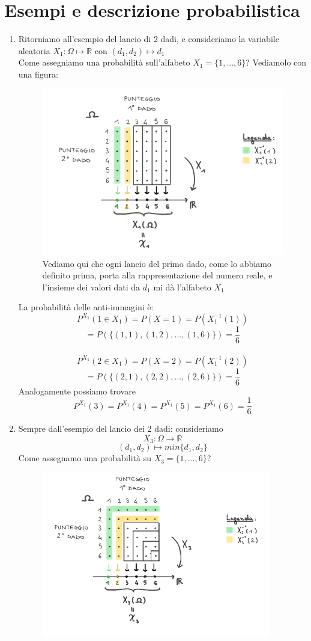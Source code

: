 \documentclass{report}
\begin{document}
\section{Esempi e descrizione probabilistica}
\begin{enumerate}
    \item Ritorniamo all'esempio del lancio di 2 dadi, e consideriamo la variabile aleatoria \(X_1: \Omega \longmapsto \mathbb{R} \text{ con } (d_1, d_2) \mapsto d_1\)\\
    Come assegniamo una probabilità sull'alfabeto \(\textit{X}_1 = \{1, ..., 6\}\)? Vediamolo con una figura:
    \begin{figure}[hb]
        \centering
        \includegraphics[width = 11cm]{VariabileAleatoriaLancio2dadi.PNG}
        \caption{Vediamo qui che ogni lancio del primo dado, come lo abbiamo definito prima, porta alla rappresentazione del numero reale, e l'insieme dei valori dati da \(d_1\) mi dà l'alfabeto \(\textit{X}_1\) }
        \label{fig:VariabileAleatoriaLancioDadi}
    \end{figure}
    La probabilità delle anti-immagini è:
    \[P^{X_1}(1 \in X_1) = P(X = 1) = P(X_1^{-1}(1))\] \[= P(\{(1,1), (1,2), ..., (1,6)\}) = \frac{1}{6}\]\\
    \[P^{X_1}(2 \in X_1) = P(X = 2) = P(X_1^{-1}(2))\] \[= P(\{(2,1), (2,2), ..., (2,6)\}) = \frac{1}{6}\] 
    Analogamente possiamo trovare \[P^{X_1}(3) = P^{X_1}(4) = P^{X_1}(5) = P^{X_1}(6) = \frac{1}{6}\]
    \clearpage
    \item Sempre dall'esempio del lancio dei 2 dadi: consideriamo \[X_3: \Omega \xrightarrow{} \mathbb{R}\] \[(d_1,d_2) \mapsto min\{d_1,d_2\}\]
    Come assegnamo una probabilità su \(X_3 = \{1,...,6\}\)?
    \begin{figure}[hb]
        \centering
        \includegraphics[width = 10cm]{PunteggioDadi2-Lez7.png}

\end{figure}
\end{enumerate}
\end{document}
